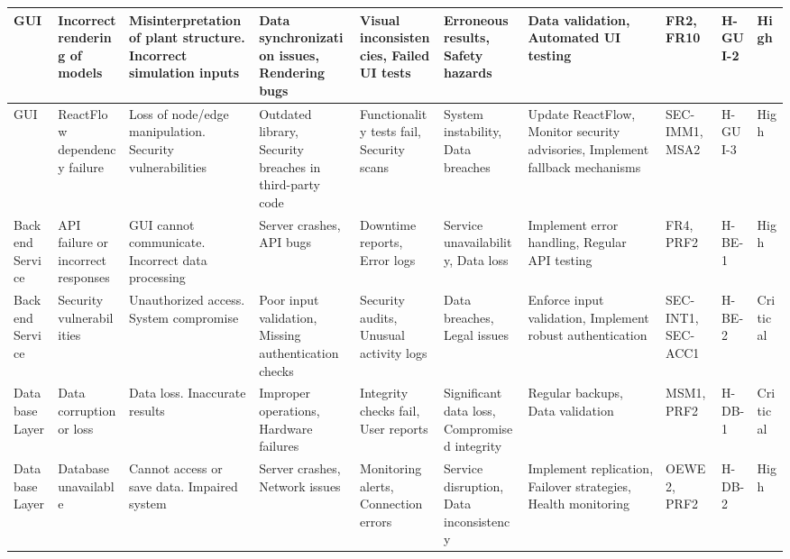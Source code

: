 \documentclass{article}
\begin{document}
\begin{landscape}
\begin{longtable}{@{} p{2cm} p{2cm} p{3cm} p{3cm} p{2.5cm} p{2.5cm} p{3.5cm} p{1cm} p{1cm} p{1cm}}
        GUI & Incorrect rendering of models & Misinterpretation of plant structure. Incorrect simulation inputs & Data synchronization issues, Rendering bugs & Visual inconsistencies, Failed UI tests & Erroneous results, Safety hazards & Data validation, Automated UI testing & FR2, FR10 & H-GUI-2 & High \\
        
        \midrule
        
        GUI & ReactFlow dependency failure & Loss of node/edge manipulation. Security vulnerabilities & Outdated library, Security breaches in third-party code & Functionality tests fail, Security scans & System instability, Data breaches & Update ReactFlow, Monitor security advisories, Implement fallback mechanisms & SEC-IMM1, MSA2 & H-GUI-3 & High \\
        
        \midrule
        
        Backend Service & API failure or incorrect responses & GUI cannot communicate. Incorrect data processing & Server crashes, API bugs & Downtime reports, Error logs & Service unavailability, Data loss & Implement error handling, Regular API testing & FR4, PRF2 & H-BE-1 & High \\
        
        \midrule
        
        Backend Service & Security vulnerabilities & Unauthorized access. System compromise & Poor input validation, Missing authentication checks & Security audits, Unusual activity logs & Data breaches, Legal issues & Enforce input validation, Implement robust authentication & SEC-INT1, SEC-ACC1 & H-BE-2 & Critical \\
        
        \midrule
        
        Database Layer & Data corruption or loss & Data loss. Inaccurate results & Improper operations, Hardware failures & Integrity checks fail, User reports & Significant data loss, Compromised integrity & Regular backups, Data validation & MSM1, PRF2 & H-DB-1 & Critical \\
        
        \midrule
        
        Database Layer & Database unavailable & Cannot access or save data. Impaired system & Server crashes, Network issues & Monitoring alerts, Connection errors & Service disruption, Data inconsistency & Implement replication, Failover strategies, Health monitoring & OEWE2, PRF2 & H-DB-2 & High \\
        

\end{longtable}
\end{landscape}
\end{document}
